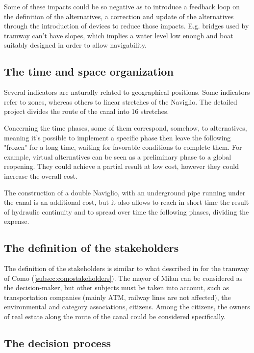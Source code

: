 Some of these impacts could be so negative as to introduce a feedback loop on the definition of the alternatives, a correction and update of the alternatives through the introduction of devices to reduce those impacts. E.g. bridges used by tramway can't have slopes, which implies a water level low enough and boat suitably designed in order to allow navigability.

\subsection{The time and space organization}
\label{subsec:navitimespace}

Several indicators are naturally related to geographical positions. Some indicators refer to zones, whereas others to linear stretches of the Naviglio. The detailed project divides the route of the canal into 16 stretches.

Concerning the time phases, some of them correspond, somehow, to alternatives, meaning it's  possible to implement a specific phase then leave the following "frozen" for a long time, waiting for favorable conditions to complete them. For example, virtual alternatives can be seen as a preliminary phase to a global reopening. They could achieve a partial result at low cost, however they could increase the overall cost.


The construction of a double Naviglio, with an underground pipe running under the canal is an additional cost, but it also allows to reach in short time the result of hydraulic continuity and to spread over time the following phases, dividing the expense.

\subsection{The definition of the stakeholders}
\label{subsec:navistakeholders}

The definition of the stakeholders is similar to what described in for the tramway of Como (\ref{subsec:comostakeholders}). The mayor of Milan can be considered as the decision-maker, but other subjects must be taken into account, such as transportation companies (mainly ATM, railway lines are not affected), the environmental and category associations, citizens. Among the citizens, the owners of real estate along the route of the canal could be considered specifically.

\subsection{The decision process}
\label{subsec:navidecision}

